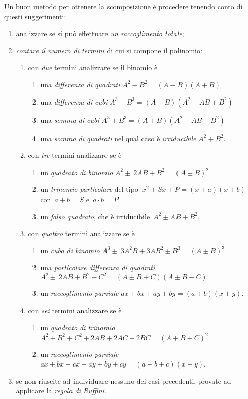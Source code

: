 Un buon metodo per ottenere la scomposizione è procedere tenendo conto
di questi suggerimenti:


\begin{enumerate}
\item analizzare se si può effettuare \emph{un raccoglimento totale};
\item \emph{contare il numero di termini} di cui si compone il polinomio:
 \begin{enumerate}
  \item con \emph{due} termini analizzare se il binomio è
   \begin{enumerate}
	\item una \emph{differenza di quadrati} 
	 $A^{2}-B^{2}=(A-B)(A+B)$
	\item una \emph{differenza di cubi}
	 $A^{3}-B^{3}=(A-B)\left(A^{2}+AB+B^{2}\right)$
	\item una \emph{somma di cubi} 
	 $A^{3}+B^{3}=(A+B)\left(A^{2}-AB+B^{2}\right)$
	\item una \emph{somma di quadrati} nel qual caso è \emph{irriducibile} 
	 $A^{2}+B^{2}$.
   \end{enumerate}
  \item con \emph{tre} termini analizzare se è
   \begin{enumerate}
	\item un \emph{quadrato di binomio} 
	 $A^{2}\pm~2AB+B^{2}=\left(A\pm B\right)^{2}$
	\item un \emph{trinomio particolare} del tipo~$x^{2}+Sx+P=(x+a)(x+b)$ 
	 con~$a+b=S$ e~$a\cdot b=P$
	\item un \emph{falso quadrato}, che è irriducibile~$A^{2}\pm AB+B^{2}$.
   \end{enumerate}
  \item con \emph{quattro} termini analizzare se è
   \begin{enumerate}
	\item un \emph{cubo di binomio} 
	 $A^{3}\pm~3A^{2}B+3AB^{2}\pm B^{3}=\left(A\pm B\right)^{3}$
	\item una \emph{particolare differenza di quadrati}
	 \subitem $A^{2}\pm~2AB+B^{2}-C^{2}=(A\pm B+C)(A\pm B-C)$
	\item un \emph{raccoglimento parziale} $ax+bx+ay+by=(a+b)(x+y)$.
   \end{enumerate}
  \item con \emph{sei} termini analizzare se è
   \begin{enumerate}
	\item un \emph{quadrato di trinomio} 
	 $A^{2}+B^{2}+C^{2}+2AB+2{AC}+2{BC}=\left(A+B+C\right)^{2}$
	\item un \emph{raccoglimento parziale}
	 \subitem $ax+{bx}+{cx}+{ay}+{by}+{cy}=(a+b+c)(x+y)$.
   \end{enumerate}
  \end{enumerate}
 \item se non riuscite ad individuare nessuno dei casi precedenti, provate ad 
  applicare la \emph{regola di Ruffini}.
\end{enumerate}


